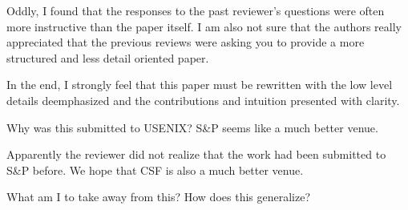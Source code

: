 Oddly, I found that the responses to the past reviewer's questions were often more instructive than the paper itself. I am also not sure that the authors really appreciated that the previous reviews were asking you to provide a more structured and less detail oriented paper.

In the end, I strongly feel that this paper must be rewritten with the low level details deemphasized and the contributions and intuition presented with clarity.

\begin{center}
\end{center}

Why was this submitted to USENIX?  S\&P seems like a much better venue.
\begin{answer}
    Apparently the reviewer did not realize that the work had been submitted to S\&P before.
    We hope that CSF is also a much better venue.
\end{answer}

What am I to take away from this?  How does this generalize?
